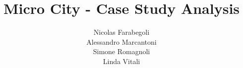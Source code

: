 \title{Micro City - Case Study Analysis}
\author{Nicolas Farabegoli\\
Alessandro Marcantoni\\
Simone Romagnoli\\
Linda Vitali}
